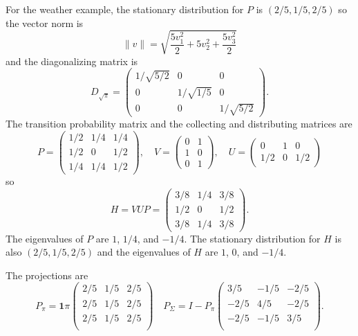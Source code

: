\documentclass[12pt]{article}
\begin{document}
\begin{example}
    For the weather example, the stationary distribution for \( P \) is \(
    (2/5, 1/5, 2/5) \) so the vector norm is
    \[
        \| v \| = \sqrt{\frac{5v_1^2}{2} + 5v_2^2 + \frac{5v_3^2}{2}}
    \] and the diagonalizing matrix is
    \[
        D_{\sqrt{\pi}} =
        \begin{pmatrix}
            1/\sqrt{5/2} & 0 & 0 \\
            0 & 1/\sqrt{1/5} & 0 \\
            0 & 0 & 1/\sqrt{5/2}
        \end{pmatrix}
        .
    \] The transition probability matrix and the collecting and
    distributing matrices are
    \[
        P =
        \begin{pmatrix}
            1/2 & 1/4 & 1/4 \\
            1/2 & 0 & 1/2 \\
            1/4 & 1/4 & 1/2
        \end{pmatrix}
        , \quad V =
        \begin{pmatrix}
            0 & 1 \\
            1 & 0 \\
            0 & 1
        \end{pmatrix}
        , \quad U =
        \begin{pmatrix}
            0 & 1 & 0 \\
            1/2 & 0 & 1/2
        \end{pmatrix}
    \] so
    \[
        H = VUP =
        \begin{pmatrix}
            3/8 & 1/4 & 3/8 \\
            1/2 & 0 & 1/2 \\
            3/8 & 1/4 & 3/8
        \end{pmatrix}
        .
    \] The eigenvalues of \( P \) are \( 1 \), \( 1/4 \), and \( -1/4 \).
    The stationary distribution for \( H \) is also \( (2/5, 1/5, 2/5) \)
    and the eigenvalues of \( H \) are \( 1 \), \( 0 \), and \( -1/4 \).

    The projections are
    \[
        P_{\pi} = \mathbf{1} \pi
        \begin{pmatrix}
            2/5 & 1/5 & 2/5 \\
            2/5 & 1/5 & 2/5 \\
            2/5 & 1/5 & 2/5 \\
        \end{pmatrix}
        \quad P_{\Sigma} = I - P_{\pi}
        \begin{pmatrix}
            3/5 & -1/5 & -2/5 \\
            -2/5 & 4/5 & -2/5 \\
            -2/5 & -1/5 & 3/5 \\
        \end{pmatrix}
        .
    \]


\end{example}
\end{document}
